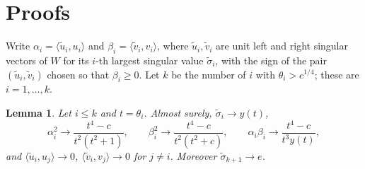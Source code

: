 \documentclass[11pt]{amsart}
\newtheorem{lem}[thm]{Lemma}
\theoremstyle{remark}
\numberwithin{equation}{section}
\begin{document}
\section{Proofs}\label{sec:proofs}
Write $\alpha_i=\langle\tilde u_i,u_i\rangle$ and $\beta_i=\langle\tilde v_i,v_i\rangle$, where $\tilde u_i,\tilde v_i$ are unit left and right singular vectors of $W$ for its $i$-th largest singular value $\tilde\sigma_i$, with the sign of the pair $(\tilde u_i,\tilde v_i)$ chosen so that $\beta_i\ge0$. Let $k$ be the number of $i$ with $\theta_i>c^{1/4}$; these are $i=1,\dots,k$.

\begin{lem}\label{lem:bgn}
Let $i\le k$ and $t=\theta_i$. Almost surely, $\tilde\sigma_i\to y(t)$,
\[
\alpha_i^2\to\frac{t^4-c}{t^2(t^2+1)},\qquad \beta_i^2\to\frac{t^4-c}{t^2(t^2+c)},\qquad \alpha_i\beta_i\to\frac{t^4-c}{t^3y(t)},
\]
and $\langle\tilde u_i,u_j\rangle\to0$, $\langle\tilde v_i,v_j\rangle\to0$ for $j\ne i$. Moreover $\tilde\sigma_{k+1}\to e$.
\end{lem}
\end{document}

